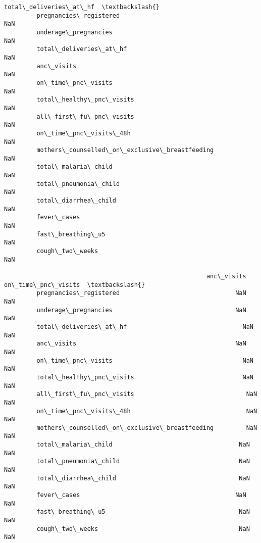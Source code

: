 \documentclass[11pt]{article}
\begin{document}
\begin{Verbatim}[commandchars=\\\{\}]
                                                        total\_deliveries\_at\_hf  \textbackslash{}
         pregnancies\_registered                                            NaN   
         underage\_pregnancies                                              NaN   
         total\_deliveries\_at\_hf                                            NaN   
         anc\_visits                                                        NaN   
         on\_time\_pnc\_visits                                                NaN   
         total\_healthy\_pnc\_visits                                          NaN   
         all\_first\_fu\_pnc\_visits                                           NaN   
         on\_time\_pnc\_visits\_48h                                            NaN   
         mothers\_counselled\_on\_exclusive\_breastfeeding                     NaN   
         total\_malaria\_child                                               NaN   
         total\_pneumonia\_child                                             NaN   
         total\_diarrhea\_child                                              NaN   
         fever\_cases                                                       NaN   
         fast\_breathing\_u5                                                 NaN   
         cough\_two\_weeks                                                   NaN   
         
                                                        anc\_visits  on\_time\_pnc\_visits  \textbackslash{}
         pregnancies\_registered                                NaN                 NaN   
         underage\_pregnancies                                  NaN                 NaN   
         total\_deliveries\_at\_hf                                NaN                 NaN   
         anc\_visits                                            NaN                 NaN   
         on\_time\_pnc\_visits                                    NaN                 NaN   
         total\_healthy\_pnc\_visits                              NaN                 NaN   
         all\_first\_fu\_pnc\_visits                               NaN                 NaN   
         on\_time\_pnc\_visits\_48h                                NaN                 NaN   
         mothers\_counselled\_on\_exclusive\_breastfeeding         NaN                 NaN   
         total\_malaria\_child                                   NaN                 NaN   
         total\_pneumonia\_child                                 NaN                 NaN   
         total\_diarrhea\_child                                  NaN                 NaN   
         fever\_cases                                           NaN                 NaN   
         fast\_breathing\_u5                                     NaN                 NaN   
         cough\_two\_weeks                                       NaN                 NaN   
         

\end{Verbatim}
\end{document}

